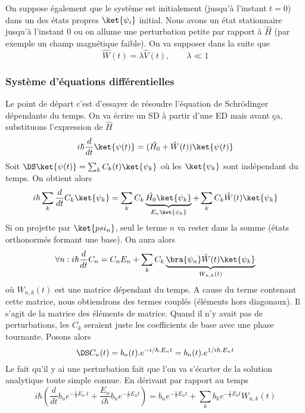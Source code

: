 		
		On suppose également que le système est initialement (jusqu'à l'instant $t=0$) dans un 
		des états propres $\ket{\psi_i}$ initial. Nous avons un état stationnaire jusqu'à 
		l'instant 0 ou on allume une perturbation petite par rapport à $\hat H$ (par exemple un 
		champ magnétique faible). On va supposer dans la suite que
		\begin{equation}
		\hat{W}(t) = \lambda \hat{V}(t),\qquad \lambda \ll 1
		\end{equation}

		\subsubsection{Système d'équations différentielles}
		Le point de départ c'est d'essayer de résoudre l'équation 	de Schrödinger dépendante du temps. 
		On va écrire un SD à partir d'une ED mais avant ça, substituons l'expression de $\hat{H}$
		\begin{equation}
		i\hbar\frac{d}{dt}\ket{\psi(t)} = (\hat{H_0}+\hat{W}(t))\ket{\psi(t)}
		\end{equation}
		Soit $\DS \ket{\psi(t)} = \sum_k C_k(t)\ket{\psi_k}$ où les $\ket{\psi_k}$ sont indépendant
		du temps. On obtient alors
		\begin{equation}
		i\hbar \sum_k \dfrac{d}{dt}C_k\ket{\psi_k} = \sum_k C_k\underbrace{\hat{H_0}\ket{\psi_k}}_{
		E_n\ket{\psi_k}} + \sum_k C_k\hat{W}(t)\ket{\psi_k}
		\end{equation}
		Si on projette par $\ket{psi_n}$, seul le terme $n$ va rester dans la somme (états orthonormés 
		formant une	base). On aura alors
		\begin{equation}
		\forall n : i\hbar \dfrac{d}{dt}C_n = C_n E_n + \sum_k C_k \underbrace{
		\bra{\psi_n}\hat{W}(t)\ket{\psi_k}}_{W_{n,k}(t)}
		\end{equation}
		où $W_{n,k}(t)$ est une matrice dépendant du temps. A cause du terme contenant cette matrice, 
		nous obtiendrons des termes couplés (éléments hors diagonaux). Il s'agit de la matrice des 
		éléments de matrice. Quand il n'y avait pas de perturbations, les $C_k$ seraient juste les 
		coefficients de base avec une phase tournante. Posons alors 
		\begin{equation}
		\DS C_n(t) = b_n(t).e^{-i/\hbar.E_nt}= b_n(t).e^{1/i\hbar.E_nt}
		\end{equation}
		Le fait qu'il y ai une 	perturbation fait que l'on va s'écarter de la solution analytique 
		toute simple connue. En dérivant par rapport au temps
		\begin{equation}
		i\hbar\left(\dfrac{d}{dt}b_ne^{-\frac{i}{\hbar}E_n.t} + \dfrac{E_n}{i\hbar}b_ne^{-\frac{i}
		{\hbar}E_nt}\right) = b_ne^{-\frac{i}{\hbar}E_nt}+ \sum_k b_k e^{-\frac{i}{\hbar}E_kt}W_{n,k}(t)
		\end{equation}
